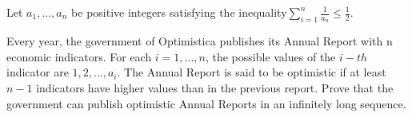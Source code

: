 Let $a_1, . . . , a_n$ be positive integers satisfying the inequality$\sum_{i=1}^{n}\frac{1}{a_n}\le \frac{1}{2}$.

Every year, the government of Optimistica publishes its Annual Report with n economic indicators. For each $i = 1, . . . , n$, the possible values of the $i-th$ indicator are $1, 2, . . . , a_i$. The Annual Report is said to be optimistic if at least $n - 1$ indicators have higher values than in the previous report. Prove that the government can publish optimistic Annual Reports in an infinitely long sequence.
